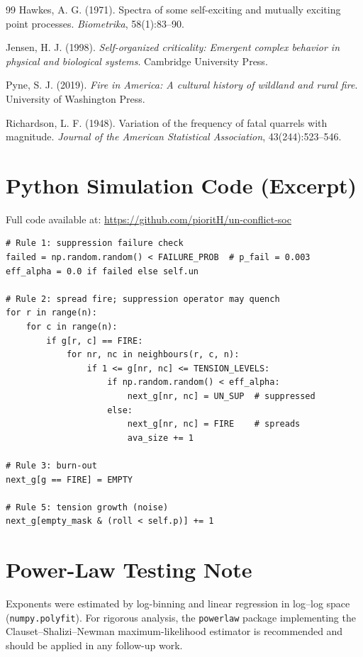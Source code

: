 \documentclass[12pt,a4paper]{article}
\begin{document}
\begin{thebibliography}{99}
Hawkes, A. G. (1971).
\newblock Spectra of some self-exciting and mutually exciting point processes.
\newblock \textit{Biometrika}, 58(1):83--90.

Jensen, H. J. (1998).
\newblock \textit{Self-organized criticality: Emergent complex behavior in physical
  and biological systems}.
\newblock Cambridge University Press.

Pyne, S. J. (2019).
\newblock \textit{Fire in America: A cultural history of wildland and rural fire}.
\newblock University of Washington Press.

Richardson, L. F. (1948).
\newblock Variation of the frequency of fatal quarrels with magnitude.
\newblock \textit{Journal of the American Statistical Association},
  43(244):523--546.

\end{thebibliography}

\appendix
\section{Python Simulation Code (Excerpt)}

Full code available at:
\url{https://github.com/pioritH/un-conflict-soc}

\begin{lstlisting}[caption={Core update loop implementing Rules 1--5.},
                   label={lst:code}]
# Rule 1: suppression failure check
failed = np.random.random() < FAILURE_PROB  # p_fail = 0.003
eff_alpha = 0.0 if failed else self.un

# Rule 2: spread fire; suppression operator may quench
for r in range(n):
    for c in range(n):
        if g[r, c] == FIRE:
            for nr, nc in neighbours(r, c, n):
                if 1 <= g[nr, nc] <= TENSION_LEVELS:
                    if np.random.random() < eff_alpha:
                        next_g[nr, nc] = UN_SUP  # suppressed
                    else:
                        next_g[nr, nc] = FIRE    # spreads
                        ava_size += 1

# Rule 3: burn-out
next_g[g == FIRE] = EMPTY

# Rule 5: tension growth (noise)
next_g[empty_mask & (roll < self.p)] += 1
\end{lstlisting}

\section{Power-Law Testing Note}

Exponents were estimated by log-binning and linear regression in log--log space
(\texttt{numpy.polyfit}). For rigorous analysis, the \texttt{powerlaw} package
\citep{alstott2014} implementing the Clauset--Shalizi--Newman maximum-likelihood
estimator \citep{clauset2009} is recommended and should be applied in any follow-up work.
\end{document}
